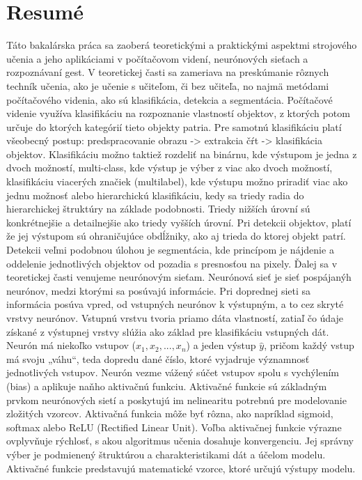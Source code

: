  \chapter{Resumé}
 \label{ch:resume}
Táto bakalárska práca sa zaoberá teoretickými a praktickými aspektmi strojového učenia a jeho aplikáciami v počítačovom videní, neurónových sieťach a rozpoznávaní gest. V teoretickej časti sa zameriava na preskúmanie rôznych techník učenia, ako je učenie s učiteľom, či bez učiteľa, no najmä metódami počítačového videnia, ako sú klasifikácia, detekcia a segmentácia.\newline
 Počítačové videnie využíva klasifikáciu na rozpoznanie vlastností objektov, z ktorých potom určuje do ktorých kategórií tieto objekty patria. Pre samotnú klasifikáciu platí všeobecný postup: predspracovanie obrazu -> extrakcia čŕt -> klasifikácia objektov. Klasifikáciu možno taktiež rozdeliť na binárnu, kde výstupom je jedna z dvoch možností, multi-class, kde výstup je výber z viac ako dvoch možností, klasifikáciu viacerých značiek (multilabel), kde výstupu možno priradiť viac ako jednu možnosť alebo hierarchickú klasifikáciu, kedy sa triedy radia do hierarchickej štruktúry na základe podobnosti. Triedy nižších úrovní sú konkrétnejšie a detailnejšie ako triedy vyšších úrovní. Pri detekcii objektov, platí že jej výstupom sú ohraničujúce obdĺžniky, ako aj trieda do ktorej objekt patrí. Detekcii veľmi podobnou úlohou je segmentácia, kde princípom je nájdenie a oddelenie jednotlivých objektov od pozadia s presnosťou na pixely.\newline
Ďalej sa v teoretickej časti venujeme neurónovým sieťam. Neurónová sieť je sieť pospájanýh neurónov, medzi ktorými sa posúvajú informácie.	Pri doprednej sieti sa informácia posúva vpred, od vstupných neurónov k výstupným, a to cez skryté vrstvy neurónov. Vstupnú vrstvu tvoria priamo dáta vlastností, zatiaľ čo údaje získané z výstupnej vrstvy slúžia ako základ pre klasifikáciu vstupných dát. Neurón má niekoľko vstupov  ($x_1, x_2, ..., x_n$) a jeden výstup $\hat{y}$, pričom každý vstup má svoju „váhu“, teda dopredu dané číslo, ktoré vyjadruje významnosť jednotlivých vstupov. Neurón vezme vážený súčet vstupov spolu s vychýlením (bias) a aplikuje naňho aktivačnú funkciu. Aktivačné funkcie sú základným prvkom neurónových sietí a poskytujú im nelinearitu potrebnú pre modelovanie zložitých vzorcov. Aktivačná funkcia môže byť rôzna, ako napríklad sigmoid, softmax alebo ReLU (Rectified Linear Unit). Voľba aktivačnej funkcie výrazne ovplyvňuje rýchlosť, s akou algoritmus učenia dosahuje konvergenciu. Jej správny výber je podmienený štruktúrou a charakteristikami dát a účelom modelu. Aktivačné funkcie predstavujú matematické vzorce, ktoré určujú výstupy modelu. \newline
